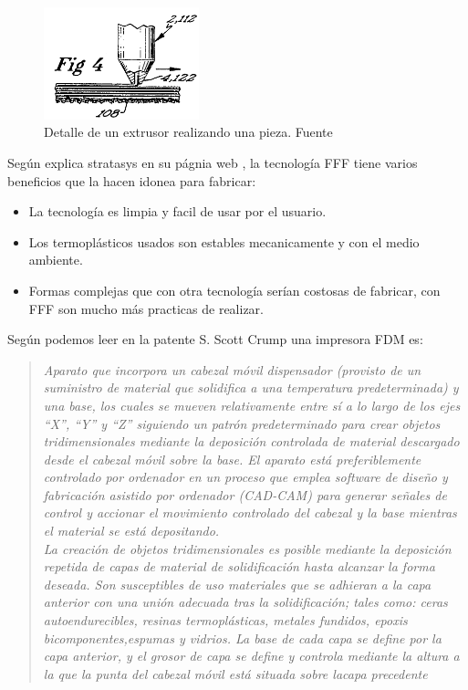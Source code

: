     \begin{figure}[H]
            \centering
            \includegraphics[width=0.4\textwidth]{images/capas_fdm.png}
            \caption{Detalle  de un extrusor realizando una pieza. Fuente  \cite{crump1992apparatus}}
            \label{fig:detalle_capas}
    \end{figure}
Según explica stratasys en su págnia web \cite{FDMTechnology}, la tecnología FFF tiene varios beneficios que la hacen idonea para fabricar:
\begin{itemize}
    \item La tecnología es limpia y facil de usar por el usuario.
    \item Los termoplásticos usados son estables mecanicamente y con el medio ambiente.
    \item Formas complejas que con otra tecnología serían costosas de fabricar, con FFF son mucho más practicas de realizar.
\end{itemize}

Según podemos leer en la patente S. Scott Crump \cite{crump1992apparatus} una impresora FDM es:

\begin{quotation}
\emph{
Aparato que incorpora un cabezal móvil dispensador (provisto de un suministro de material que solidifica a una temperatura predeterminada) y una base, los cuales se mueven relativamente entre sí a lo largo de los ejes “X”, “Y” y “Z” siguiendo un patrón predeterminado para crear objetos tridimensionales mediante la deposición controlada de material descargado desde el cabezal móvil sobre la base. El aparato está preferiblemente controlado por ordenador en un proceso que emplea software de diseño y fabricación asistido por ordenador (CAD-CAM) para generar señales de control y accionar el movimiento controlado del cabezal y la base mientras el material se está depositando.}\\

\emph{La creación de objetos tridimensionales es posible mediante la deposición repetida de  capas de material de solidificación hasta alcanzar la forma deseada. Son susceptibles de uso materiales que se adhieran a la capa anterior con una unión adecuada tras la solidificación; tales como: ceras autoendurecibles, resinas termoplásticas, metales fundidos, epoxis bicomponentes,espumas y vidrios. La base de cada capa se define por la capa anterior, y el grosor de capa se define y controla mediante la altura a la que la punta del cabezal móvil está situada sobre lacapa precedente}

\end{quotation}

